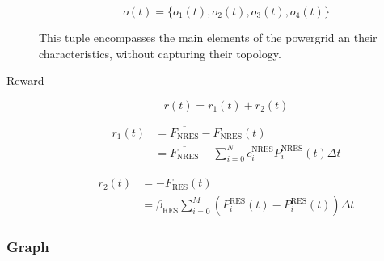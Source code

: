 \begin{description}
	\begin{equation} \label{eq:simple-obs-space}
		o(t)= \{ o_{1}(t), o_{2}(t), o_{3}(t), o_{4}(t) \}
	\end{equation}
	
	This tuple encompasses the main elements of the powergrid an their characteristics, without capturing their topology.
	
	\item[Reward] 
	
	\begin{equation}
		r(t) = r_1(t) + r_2(t)
	\end{equation}
	
	\begin{equation}
		\begin{split}
			r_1(t) &= \overline{F_\text{NRES}} - F_\text{NRES}(t) \\
			&= \overline{F_\text{NRES}} - \sum^N_{i=0} c^\text{NRES}_i P^\text{NRES}_i(t) \Delta t
		\end{split}
	\end{equation}
	
	\begin{equation}
		\begin{split}
			r_2(t) &= - F_\text{RES}(t) \\
			&= \beta_\text{RES} \sum^M_{i=0} (\overline{P^\text{RES}_i}(t) - P^\text{RES}_i(t)) \Delta t
		\end{split}
	\end{equation}
\end{description}


\subsubsection{Graph}

